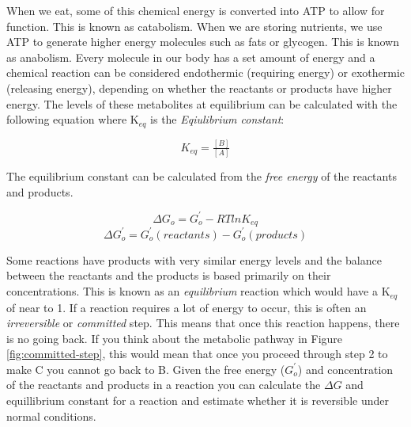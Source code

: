 \documentclass{tufte-handout}
\begin{document}
  When we eat, some of this chemical energy is converted into ATP to allow for function.  This is known as catabolism.  When we are storing nutrients, we use ATP to generate higher energy molecules such as fats or glycogen.  This is known as anabolism.  Every molecule in our body has a set amount of energy and a chemical reaction can be considered endothermic (requiring energy) or exothermic (releasing energy), depending on whether the reactants or products have higher energy.  The levels of these metabolites at equilibrium can be calculated with the following equation where K$_{eq}$ is the \emph{Eqiulibrium constant}:

\begin{equation}
K_{eq}=\tfrac{[B]}{[A]}
\end{equation}

 The equilibrium constant can be calculated from the \emph{free energy} of the reactants and products.

\begin{equation}
\Delta G_{o} = G^{'}_{o} - R T ln K_{eq}
\end{equation}
\begin{equation}
\Delta G^{'}_{o} = G^{'}_{o} (reactants) - G^{'}_{o} (products) 
 \end{equation}


Some reactions have products with very similar energy levels and the balance between the reactants and the products is based primarily on their concentrations.  This is known as an \emph{equilibrium} reaction which would have a K$_{eq}$ of near to 1.  If a reaction requires a lot of energy to occur, this is often an \emph{irreversible} or \emph{committed} step.  This means that once this reaction happens, there is no going back.  If you think about the metabolic pathway in Figure \ref{fig:committed-step}, this would mean that once you proceed through step 2 to make  C you cannot go back to B.  Given the free energy ($G^{'}_{o}$) and concentration of the reactants and products in a reaction you can calculate the $\Delta G$ and equillibrium constant for a reaction and estimate whether it is reversible under normal conditions.
\end{document}
